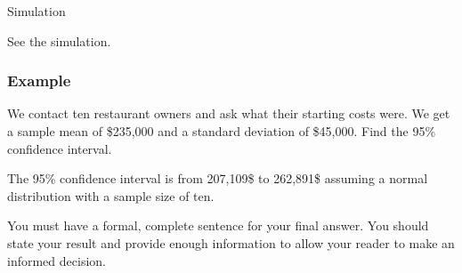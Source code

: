 \begin{frame}{Simulation}

  See the simulation.
  
\end{frame}


\begin{frame}
  \frametitle{Example}

  We contact ten restaurant owners and ask what their starting costs
  were. We get a sample mean of \$235,000 and a standard deviation of
  \$45,000. Find the 95\% confidence interval.

  \vfill

  {

    The 95\% confidence interval is from 207,109\$ to 262,891\$
    assuming a normal distribution with a sample size of ten.

  }

  \vfill

  {

    {\color{red}You must have a formal, complete sentence for your
      final answer. You should state your result and provide enough
      information to allow your reader to make an informed decision.}

  }

\end{frame}


